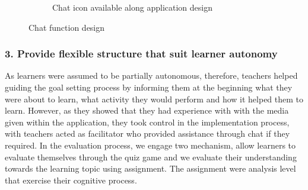\begin{figure}[H]
\begin{subfigure}{0.8\textwidth}
\caption{Chat icon available along application design}
    \end{subfigure}\hspace{0.05\textwidth}
  \caption{Chat function design}
\end{figure}

\newpage 
\subsubsection{3. Provide flexible structure that suit learner autonomy}
As learners were assumed to be partially autonomous, therefore, teachers helped guiding the goal setting process by informing them at the beginning what they were about to learn, what activity they would perform and how it helped them to learn. However, as they showed that they had experience with with the media given within the application, they took control in the implementation process, with teachers acted as facilitator who provided assistance through chat if they required. In the evaluation process, we engage two mechanism, allow learners to evaluate themselves through the quiz game and we evaluate their understanding towards the learning topic using assignment. The assignment were analysis level that exercise their cognitive process. 

